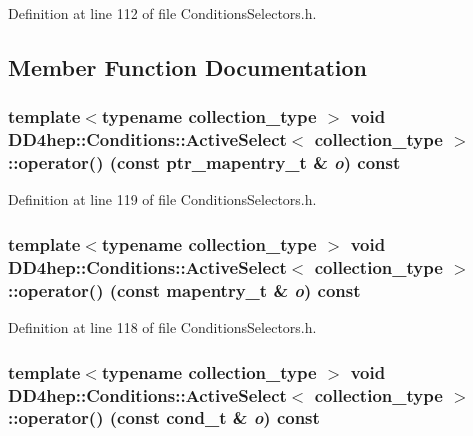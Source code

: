 Definition at line 112 of file ConditionsSelectors.h.

\subsection{Member Function Documentation}
\hypertarget{class_d_d4hep_1_1_conditions_1_1_active_select_a1a29db4459e5a36bcfb4a28934fc62e6}{
\subsubsection[{operator()}]{\setlength{\rightskip}{0pt plus 5cm}template$<$typename collection\_\-type $>$ void {\bf DD4hep::Conditions::ActiveSelect}$<$ collection\_\-type $>$::operator() (const {\bf ptr\_\-mapentry\_\-t} \& {\em o}) const}}
\label{class_d_d4hep_1_1_conditions_1_1_active_select_a1a29db4459e5a36bcfb4a28934fc62e6}


Definition at line 119 of file ConditionsSelectors.h.\hypertarget{class_d_d4hep_1_1_conditions_1_1_active_select_ac2b8f7ae0fcbf7365076f4b3ea2997ca}{
\subsubsection[{operator()}]{\setlength{\rightskip}{0pt plus 5cm}template$<$typename collection\_\-type $>$ void {\bf DD4hep::Conditions::ActiveSelect}$<$ collection\_\-type $>$::operator() (const {\bf mapentry\_\-t} \& {\em o}) const}}
\label{class_d_d4hep_1_1_conditions_1_1_active_select_ac2b8f7ae0fcbf7365076f4b3ea2997ca}


Definition at line 118 of file ConditionsSelectors.h.\hypertarget{class_d_d4hep_1_1_conditions_1_1_active_select_ab98ffa2804b36dc77d78f7c3a46e6917}{
\subsubsection[{operator()}]{\setlength{\rightskip}{0pt plus 5cm}template$<$typename collection\_\-type $>$ void {\bf DD4hep::Conditions::ActiveSelect}$<$ collection\_\-type $>$::operator() (const {\bf cond\_\-t} \& {\em o}) const}}
\label{class_d_d4hep_1_1_conditions_1_1_active_select_ab98ffa2804b36dc77d78f7c3a46e6917}


